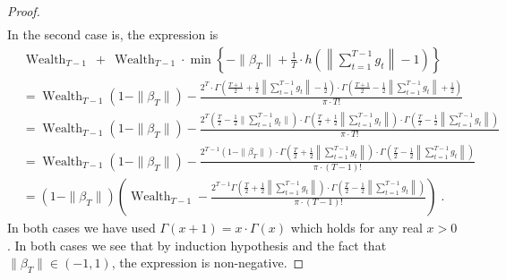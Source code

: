 \documentclass{article}
\DeclareMathOperator{\Wealth}{Wealth}
\begin{document}
\begin{proof}
\begin{align*}
\end{align*}
In the second case is, the expression is
\begin{align*}
& \Wealth_{T-1} \ + \ \Wealth_{T-1} \cdot \min \left\{ - \|\beta_T\| + \frac{1}{T} \cdot h\left(\left\|\sum_{t=1}^{T-1} g_t \right\| - 1 \right) \right\} \\
& = \Wealth_{T-1} (1 - \|\beta_T\|) - \frac{2^T \cdot \Gamma \left(\frac{T+1}{2} + \frac{1}{2}\left\|\sum_{t=1}^{T-1} g_t \right\| - \frac{1}{2} \right) \cdot \Gamma \left(\frac{T+1}{2} - \frac{1}{2} \left\|\sum_{t=1}^{T-1} g_t \right\| + \frac{1}{2} \right)}{\pi \cdot T!} \\
& = \Wealth_{T-1} (1 - \|\beta_T\|) - \frac{2^T \left( \frac{T}{2} - \frac{1}{2}\|\sum_{t=1}^{T-1} g_t\| \right) \cdot \Gamma \left(\frac{T}{2} + \frac{1}{2}\left\|\sum_{t=1}^{T-1} g_t \right\| \right) \cdot \Gamma \left(\frac{T}{2} - \frac{1}{2} \left\|\sum_{t=1}^{T-1} g_t \right\| \right)}{\pi \cdot T!} \\
& = \Wealth_{T-1} (1 - \|\beta_T\|) - \frac{2^{T-1} \left( 1 - \|\beta_T\| \right) \cdot \Gamma \left(\frac{T}{2} + \frac{1}{2}\left\|\sum_{t=1}^{T-1} g_t \right\| \right) \cdot \Gamma \left(\frac{T}{2} - \frac{1}{2} \left\|\sum_{t=1}^{T-1} g_t \right\| \right)}{\pi \cdot (T-1)!} \\
& = (1 - \|\beta_T\|) \left( \Wealth_{T-1}  - \frac{2^{T-1} \Gamma \left(\frac{T}{2} + \frac{1}{2}\left\|\sum_{t=1}^{T-1} g_t \right\| \right) \cdot \Gamma \left(\frac{T}{2} - \frac{1}{2} \left\|\sum_{t=1}^{T-1} g_t \right\| \right)}{\pi \cdot (T-1)!} \right) \; .
\end{align*}
In both cases we have used $\Gamma(x+1) = x \cdot \Gamma(x)$ which holds for any real $x > 0$.
In both cases we see that by induction hypothesis and the fact that $\|\beta_T\| \in (-1,1)$, the expression is non-negative.
\end{proof}


\end{document}
